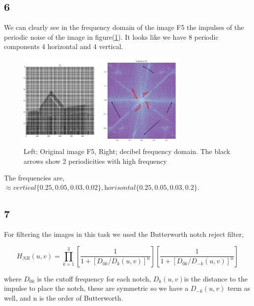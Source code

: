 {\subsection{6}


We can clearly see in the frequency domain of the image F5 the impulses of the periodic noise of the image in figure(\ref{F5period}). It looks like we have 8 periodic components 4 horizontal and 4 vertical.


\begin{figure}[!htb]
    {\centering
        \includegraphics[width=0.75\textwidth]{superpositionfreq.png}
        \caption{Left; Original image F5, Right; decibel frequency domain. The black arrows show 2 periodicities with high frequency}
        \label{F5period}
    \par}
    \end{figure}


The frequencies are, $\approx \textit{vertical}\{0.25, 0.05, 0.03, 0.02\}, \textit{horisontal}\{0.25, 0.05, 0.03, 0.2\}$.





\subsection{7}


For filtering the images in this task we used the Butterworth notch reject filter,

\begin{equation}
    H_{NR}(u,v) = \prod_{k=1}^{3}\left[\frac{1}{1+[D_{0k}/D_{k}(u,v)]^{n}} \right]\left[\frac{1}{1+[D_{0k}/D_{-k}(u,v)]^{n}} \right]
    \label{notchiboy}
\end{equation}

where $D_{0k}$ is the cutoff frequency for each notch, $D_{k}(u,v) $is the distance to the impulse to place the notch, these are symmetric so we have a $D_{-k}(u,v)$ term as well, and n is the order of Butterworth.

}
